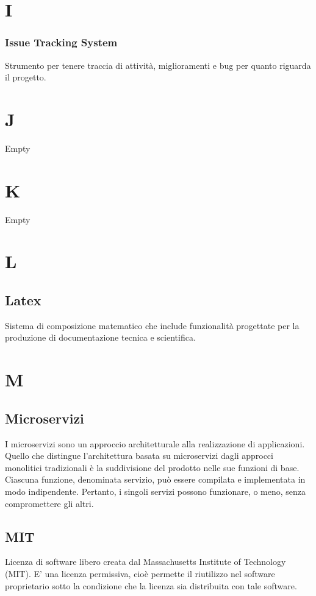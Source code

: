 \section*{I}
\subsubsection*{Issue Tracking System}
Strumento per tenere traccia di attività, miglioramenti e bug per quanto riguarda il progetto.

\section*{J}
Empty

\section*{K}
Empty

\section*{L}
\subsection*{Latex}
Sistema di composizione matematico che include funzionalità progettate per la produzione di documentazione tecnica e scientifica.

\section*{M}
\subsection*{Microservizi}
I microservizi sono un approccio architetturale alla realizzazione di applicazioni. 
Quello che distingue l'architettura basata su microservizi dagli approcci monolitici tradizionali 
è la suddivisione del prodotto nelle sue funzioni di base. Ciascuna funzione, denominata servizio, può essere 
compilata e implementata in modo indipendente. Pertanto, i singoli servizi possono funzionare, o meno, senza compromettere gli altri.

\subsection*{MIT}
Licenza di software libero creata dal Massachusetts Institute of Technology (MIT).
E' una licenza permissiva, cioè permette il riutilizzo nel software proprietario sotto la condizione che la licenza sia distribuita con tale software.

